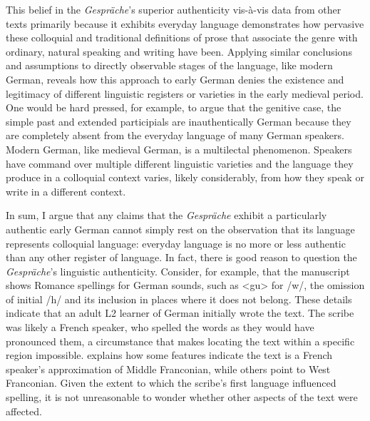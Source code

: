 This belief in the \textit{Gespräche}’s superior authenticity vis-à-vis data from other texts primarily because it exhibits everyday language demonstrates how pervasive these colloquial and traditional definitions of prose that associate the genre with ordinary, natural speaking and writing have been. Applying similar conclusions and assumptions to directly observable stages of the language, like modern German, reveals how this approach to early German denies the existence and legitimacy of different linguistic registers or varieties in the early medieval period. One would be hard pressed, for example, to argue that the genitive case, the simple past and extended participials are inauthentically German because they are completely absent from the everyday language of many German speakers. Modern German, like medieval German, is a multilectal phenomenon. Speakers have command over multiple different linguistic varieties and the language they produce in a colloquial context varies, likely considerably, from how they speak or write in a different context.

In sum, I argue that any claims that the \textit{Gespräche} exhibit a particularly authentic early German cannot simply rest on the observation that its language represents colloquial language: everyday language is no more or less authentic than any other register of language. In fact, there is good reason to question the \textit{Gespräche}’s linguistic authenticity. Consider, for example, that the manuscript shows Romance spellings for German sounds, such as <gu> for /w/, the omission of initial /h/ and its inclusion in places where it does not belong. These details indicate that an adult L2 learner of German initially wrote the text. The scribe was likely a French speaker, who spelled the words as they would have pronounced them, a circumstance that makes locating the text within a specific region impossible. \citet[102]{Bostock1976} explains how some features indicate the text is a French speaker’s approximation of Middle Franconian, while others point to West Franconian. Given the extent to which the scribe’s first language influenced spelling, it is not unreasonable to wonder whether other aspects of the text were affected.

